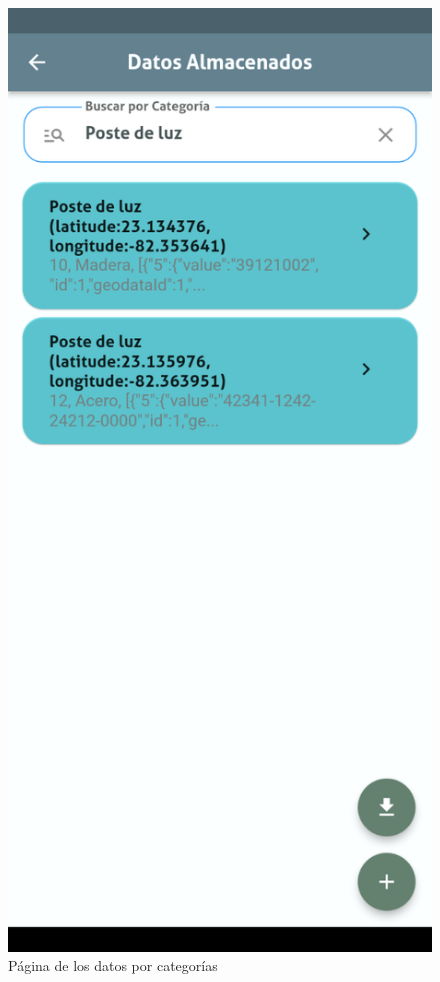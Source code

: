 \documentclass[12pt, a4paper]{book}
\begin{document}
\begin{figure}[H]
\begin{minipage}[b]{0.3\textwidth}
    \caption{Página de los datos por categorías}
    \label{fig:geodataexporter1}
  \end{minipage}
  \hspace{0.02\textwidth}
  \begin{minipage}[b]{0.3\textwidth}
    \centering
    \includegraphics[width=\textwidth]{images/functionality_test/geodata_exporter11.png}

\end{minipage}
\end{figure}
\end{document}
